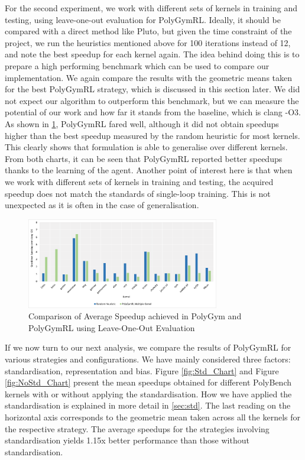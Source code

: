 \documentclass[logo,msc]{infthesis}           %
\begin{document}
 For the second experiment, we work with different sets of kernels in training and testing, using leave-one-out evaluation for PolyGymRL. Ideally, it should be compared with a direct method like Pluto\cite{Bondhugula07pluto:a}, but given the time constraint of the project, we run the heuristics mentioned above for 100 iterations instead of 12, and note the best speedup for each kernel again. The idea behind doing this is to prepare a high performing benchmark which can be used to compare our implementation. We again compare the results with the geometric means taken for the best PolyGymRL strategy, which is discussed in this section later. We did not expect our algorithm to outperform this benchmark, but we can measure the potential of our work and how far it stands from the baseline, which is clang -O3. As shown in \ref{fig:multi_PolyGym_PolyGymRL}, PolyGymRL fared well, although it did not obtain speedups higher than the best speedup measured by the random heuristic for most kernels. This clearly shows that formulation is able to generalise over different kernels. From both charts, it can be seen that PolyGymRL reported better speedups thanks to the learning of the agent. Another point of interest here is that when we work with different sets of kernels in training and testing, the acquired speedup does not match the standards of single-loop training. This is not unexpected as it is often in the case of generalisation.

\begin{figure}[htbp]
  \centering
  \includegraphics[width=0.75\textwidth]{Images/Chart_Multiple_PolyGym_PolyGymRL.png}    
  \caption{Comparison of Average Speedup achieved in PolyGym and PolyGymRL using Leave-One-Out Evaluation}
  \label{fig:multi_PolyGym_PolyGymRL}
\end{figure}

If we now turn to our next analysis, we compare the results of PolyGymRL for various strategies and configurations. We have mainly considered three factors: standardisation, representation and bias. Figure \ref{fig:Std_Chart} and Figure \ref{fig:NoStd_Chart} present the mean speedups obtained for different PolyBench kernels with or without applying the standardisation. How we have applied the standardisation is explained in more detail in \ref{sec:std}. The last reading on the horizontal axis corresponds to the geometric mean taken across all the kernels for the respective strategy. The average speedups for the strategies involving standardisation yields 1.15x better performance than those without standardisation. 
\end{document}
